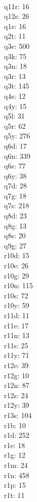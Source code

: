\begin{multicols}{8}
  \\q11r: 16
  \\q12s: 26
  \\q1e: 16
  \\q2t: 11
  \\q3e: 500
  \\q3k: 75
  \\q3n: 18
  \\q3r: 13
  \\q3t: 145
  \\q4s: 12
  \\q4y: 15
  \\q5l: 31
  \\q5r: 62
  \\q5y: 276
  \\q6d: 17
  \\q6n: 339
  \\q6s: 77
  \\q6y: 38
  \\q7d: 28
  \\q7g: 18
  \\q7s: 218
  \\q8d: 23
  \\q8g: 13
  \\q8s: 20
  \\q9g: 27
  \\r10d: 15
  \\r10e: 26
  \\r10g: 29
  \\r10n: 115
  \\r10s: 72
  \\r10y: 59
  \\r11d: 11
  \\r11e: 17
  \\r11n: 13
  \\r11s: 25
  \\r11y: 71
  \\r12e: 39
  \\r12g: 10
  \\r12n: 87
  \\r12s: 24
  \\r12y: 39
  \\r13s: 104
  \\r1b: 10
  \\r1d: 252
  \\r1e: 18
  \\r1g: 12
  \\r1m: 24
  \\r1n: 458
  \\r1p: 15
  \\r1t: 11

\end{multicols}
